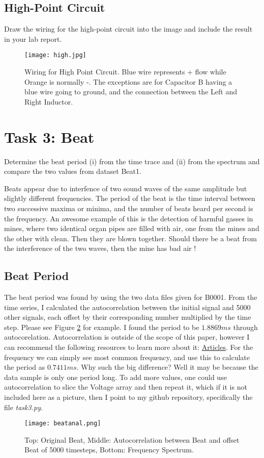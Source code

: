 \documentclass{article}
\begin{document}
\subsection{High-Point Circuit}
Draw the wiring for the high-point circuit into the image and include the result in your lab report.


\begin{figure}[h]
  \centering
  \texttt{[image: high.jpg]}
  \caption{Wiring for High Point Circuit. Blue wire represents + flow while Orange is normally -. The exceptions are for Capacitor B having a blue wire going to ground, and the connection between the Left and Right Inductor.}
  \label{highpoint}
\end{figure}


\section{Task 3: Beat}
Determine the beat period (i) from the time trace and (ii) from the spectrum and compare the two values from dataset Beat1.

Beats appear due to interfence of two sound waves of the same amplitude but slightly different frequencies. The period of the beat is the time interval between two successive maxima or minima, and the number of beats heard per second is the frequency. An awesome example of this is the detection of harmful gasses in mines, where two identical organ pipes are filled with air, one from the mines and the other with clean. Then they are blown together. Should there be a beat from the interference of the two waves, then the mine has bad air \cite{organ_fact}!


\subsection{Beat Period}
The beat period was found by using the two data files given for B0001. From the time series, I calculated the autocorrelation between the initial signal and 5000 other signals, each offset by their corresponding number multiplied by the time step. Please see Figure \ref{beatanal} for example. I found the period to be $1.8869 ms$ through autocorelation. Autocorrelation is outside of the scope of this paper, however I can recommend the following resources to learn more about it: \href{https://www.sciencedirect.com/topics/earth-and-planetary-sciences/autocorrelation}{Articles}. For the frequency we can simply see most common frequency, and use this to calculate the period as $0.7411 ms$. Why such the big difference? Well it may be because the data sample is only one period long. To add more values, one could use autocorrelation to slice the Voltage array and then repeat it, which if it is not included here as a picture, then I point to my github repository, specifically the file \textit{task3.py}.
\begin{figure}[h]
  \centering
  \texttt{[image: beatanal.png]}
  \caption[scale=0.5]{Top: Original Beat, Middle: Autocorrelation between Beat and offset Beat of 5000 timesteps, Bottom: Frequency Spectrum.}
  \label{beatanal}
\end{figure}
\end{document}
